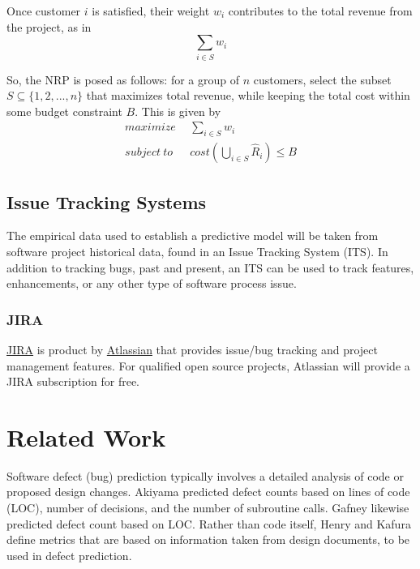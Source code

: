 \documentclass[a4paper]{scrartcl}
\begin{document}
Once customer $i$ is satisfied, their weight $w_i$ contributes to the total revenue from the project, as in
\begin{equation}
\sum_{i \in S} w_i
\end{equation}

So, the NRP is posed as follows: for a group of $n$ customers, select the subset $S \subseteq \{ 1,2,...,n \}$ that maximizes total revenue, while keeping the total cost within some budget constraint $B$. This is given by 
\begin{equation}
\begin{split}
maximize~~& \sum_{i \in S} w_i \\
subject~to~~~& cost(\bigcup_{i \in S} \hat{R}_i) \le B
\end{split}
\end{equation}

\subsection{Issue Tracking Systems}
The empirical data used to establish a predictive model will be taken from software project historical data, found in an Issue Tracking System (ITS). In addition to tracking bugs, past and present, an ITS can be used to track features, enhancements, or any other type of software process issue. 

\subsubsection{JIRA}
\href{https://www.atlassian.com/software/jira}{JIRA} is product by \href{https://www.atlassian.com/}{Atlassian} that provides issue/bug tracking and project management features. For qualified open source projects, Atlassian will provide a JIRA subscription for free.

\section{Related Work}
\label{sec:related_work}

Software defect (bug) prediction typically involves a detailed analysis of code or proposed design changes. Akiyama \cite{1971_akiyama} predicted defect counts based on lines of code (LOC), number of decisions, and the number of subroutine calls. Gafney \cite{1984_gaffney_estimating} likewise predicted defect count based on LOC. Rather than code itself, Henry and Kafura \cite{1984_henry_evaluation} define metrics that are based on information taken from design documents, to be used in defect prediction.
\end{document}
